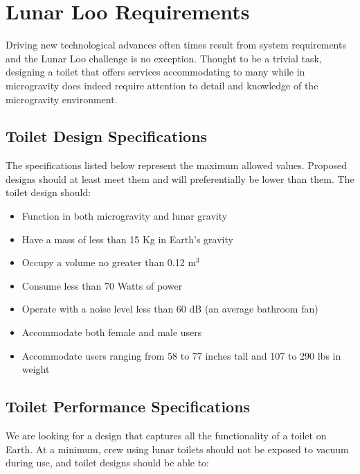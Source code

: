 \section{Lunar Loo Requirements}
Driving new technological advances often times result from system requirements and the Lunar Loo challenge is no exception. Thought to be a trivial task, designing a toilet that offers services accommodating to many while in microgravity does indeed require attention to detail and knowledge of the microgravity environment.

    \subsection{Toilet Design Specifications}

    The specifications listed below represent the maximum allowed values.  Proposed designs should at least meet them and will preferentially be lower than them.  The toilet design should:

    \begin{itemize}
        \item Function in both microgravity and lunar gravity
        \item Have a mass of less than 15 Kg in Earth’s gravity
        \item Occupy a volume no greater than 0.12 $\text{m}^3$
        \item Consume less than 70 Watts of power
        \item Operate with a noise level less than 60 dB (an average bathroom fan)
        \item Accommodate both female and male users
        \item Accommodate users ranging from 58 to 77 inches tall and 107 to 290 lbs in weight
    \end{itemize}
    
    \subsection{Toilet Performance Specifications}

    We are looking for a design that captures all the functionality of a toilet on Earth.  At a minimum, crew using lunar toilets should not be exposed to vacuum during use, and toilet designs should be able to:

